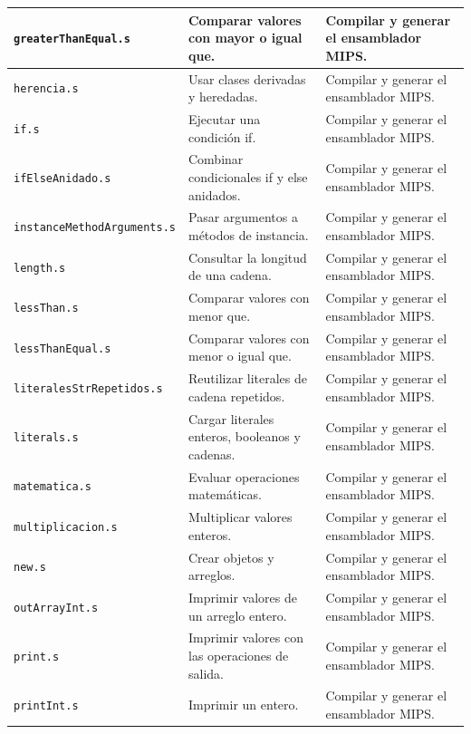 \begin{longtable}{|>{\raggedright\arraybackslash}p{}|>{\raggedright\arraybackslash}p{}|>{\raggedright\arraybackslash}p{}|}
\texttt{greaterThanEqual\allowbreak .s} & Comparar valores con mayor o igual que. & Compilar y generar el ensamblador MIPS. \\ \hline
\texttt{herencia\allowbreak .s} & Usar clases derivadas y heredadas. & Compilar y generar el ensamblador MIPS. \\ \hline
\texttt{if\allowbreak .s} & Ejecutar una condición if. & Compilar y generar el ensamblador MIPS. \\ \hline
\texttt{ifElseAnidado\allowbreak .s} & Combinar condicionales if y else anidados. & Compilar y generar el ensamblador MIPS. \\ \hline
\texttt{instanceMethodArguments\allowbreak .s} & Pasar argumentos a métodos de instancia. & Compilar y generar el ensamblador MIPS. \\ \hline
\texttt{length\allowbreak .s} & Consultar la longitud de una cadena. & Compilar y generar el ensamblador MIPS. \\ \hline
\texttt{lessThan\allowbreak .s} & Comparar valores con menor que. & Compilar y generar el ensamblador MIPS. \\ \hline
\texttt{lessThanEqual\allowbreak .s} & Comparar valores con menor o igual que. & Compilar y generar el ensamblador MIPS. \\ \hline
\texttt{literalesStrRepetidos\allowbreak .s} & Reutilizar literales de cadena repetidos. & Compilar y generar el ensamblador MIPS. \\ \hline
\texttt{literals\allowbreak .s} & Cargar literales enteros, booleanos y cadenas. & Compilar y generar el ensamblador MIPS. \\ \hline
\texttt{matematica\allowbreak .s} & Evaluar operaciones matemáticas. & Compilar y generar el ensamblador MIPS. \\ \hline
\texttt{multiplicacion\allowbreak .s} & Multiplicar valores enteros. & Compilar y generar el ensamblador MIPS. \\ \hline
\texttt{new\allowbreak .s} & Crear objetos y arreglos. & Compilar y generar el ensamblador MIPS. \\ \hline
\texttt{outArrayInt\allowbreak .s} & Imprimir valores de un arreglo entero. & Compilar y generar el ensamblador MIPS. \\ \hline
\texttt{print\allowbreak .s} & Imprimir valores con las operaciones de salida. & Compilar y generar el ensamblador MIPS. \\ \hline
\texttt{printInt\allowbreak .s} & Imprimir un entero. & Compilar y generar el ensamblador MIPS. \\ \hline

\end{longtable}
